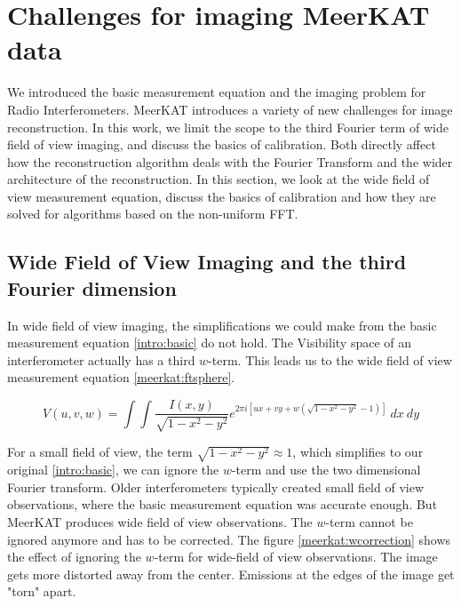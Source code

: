\section{Challenges for imaging MeerKAT data} \label{meerkat}
We introduced the basic measurement equation and the imaging problem for Radio Interferometers. MeerKAT introduces a variety of new challenges for image reconstruction. In this work, we limit the scope to the third Fourier term of wide field of view imaging, and discuss the basics of calibration. Both directly affect how the reconstruction algorithm deals with the Fourier Transform and the wider architecture of the reconstruction. In this section, we look at the wide field of view measurement equation, discuss the basics of calibration and how they are solved for algorithms based on the non-uniform FFT.


\subsection{Wide Field of View Imaging and the third Fourier dimension} \label{meerkat:wof}
In wide field of view imaging, the simplifications we could make from the basic measurement equation \eqref{intro:basic} do not hold. The Visibility space of an interferometer actually has a third $w$-term. This leads us to the wide field of view measurement equation \eqref{meerkat:ftsphere}.

\begin{equation}\label{meerkat:ftsphere}
V(u, v, w) = \int\int \frac{I(x, y)}{\sqrt{1 - x^2 - y ^2}} e^{2 \pi i [ux+vy+ w(\sqrt{1 - x^2 - y ^2} - 1)]} \: dx \: dy
\end{equation}

For a small field of view, the term  $\sqrt{1 - x^2 - y ^2} \approx 1$, which simplifies to our original \eqref{intro:basic}, we can ignore the $w$-term and use the two dimensional Fourier transform. Older interferometers typically created small field of view observations, where the basic measurement equation was accurate enough. But MeerKAT produces wide field of view observations. The $w$-term cannot be ignored anymore and has to be corrected. The figure \ref{meerkat:wcorrection} shows the effect of ignoring the $w$-term for wide-field of view observations. The image gets more distorted away from the center. Emissions at the edges of the image get "torn" apart.

